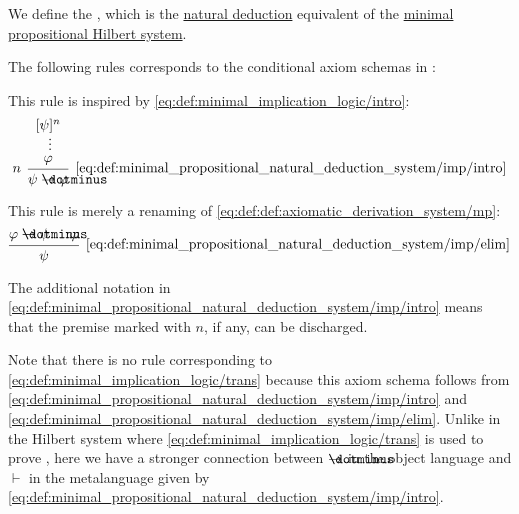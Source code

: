 \begin{definition}\label{def:minimal_propositional_natural_deduction_system}
  We define the , which is the \hyperref[def:propositional_natural_deduction_system]{natural deduction} equivalent of the \hyperref[def:minimal_propositional_hilbert_system]{minimal propositional Hilbert system}.

  \begin{thmenum}
     The following rules corresponds to the conditional axiom schemas in :

    \begin{minipage}[t]{0.45\textwidth}
      This rule is inspired by \eqref{eq:def:minimal_implication_logic/intro}:
      \begin{equation*}\taglabel[\( \rightarrow^+ \)]{eq:def:minimal_propositional_natural_deduction_system/imp/intro}
        \begin{prooftree}
          \hypo{ [\psi]^n }
          \ellipsis {} { \varphi }
          \infer[left label=\( n \)]1[\ref{eq:def:minimal_propositional_natural_deduction_system/imp/intro}]{ \psi \synimplies \varphi }
        \end{prooftree}
      \end{equation*}
    \end{minipage}
    \hfill
    \begin{minipage}[t]{0.45\textwidth}
      This rule is merely a renaming of \eqref{eq:def:def:axiomatic_derivation_system/mp}:
      \begin{equation*}\taglabel[\( \rightarrow^- \)]{eq:def:minimal_propositional_natural_deduction_system/imp/elim}
        \begin{prooftree}
          \hypo{ \varphi \synimplies \psi }
          \hypo{ \varphi }
          \infer2[\ref{eq:def:minimal_propositional_natural_deduction_system/imp/elim}]{ \psi }
        \end{prooftree}
      \end{equation*}
    \end{minipage}

    The additional notation in \eqref{eq:def:minimal_propositional_natural_deduction_system/imp/intro} means that the premise marked with \( n \), if any, can be discharged.

    Note that there is no rule corresponding to \eqref{eq:def:minimal_implication_logic/trans} because this axiom schema follows from \eqref{eq:def:minimal_propositional_natural_deduction_system/imp/intro} and \eqref{eq:def:minimal_propositional_natural_deduction_system/imp/elim}. Unlike in the Hilbert system where \eqref{eq:def:minimal_implication_logic/trans} is used to prove , here we have a stronger connection between \( \synimplies \) in the object language and \( \vdash \) in the metalanguage given by \eqref{eq:def:minimal_propositional_natural_deduction_system/imp/intro}.


\end{thmenum}
\end{definition}
